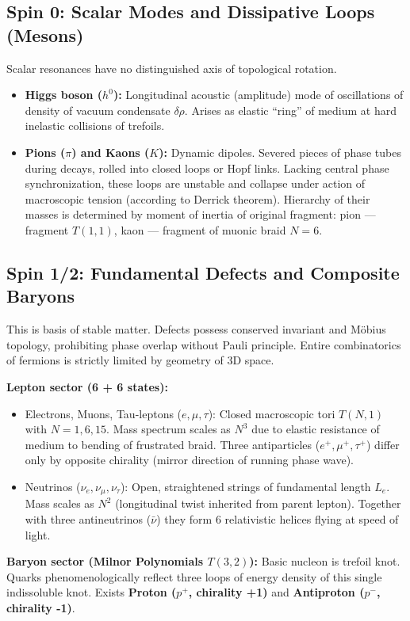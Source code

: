 \documentclass[12pt,a4paper]{article}
\begin{document}
\subsection{Spin 0: Scalar Modes and Dissipative Loops (Mesons)}
Scalar resonances have no distinguished axis of topological rotation.
\begin{itemize}
    \item \textbf{Higgs boson ($h^0$):} Longitudinal acoustic (amplitude) mode of oscillations of density of vacuum condensate $\delta\rho$. Arises as elastic ``ring'' of medium at hard inelastic collisions of trefoils.
    \item \textbf{Pions ($\pi$) and Kaons ($K$):} Dynamic dipoles. Severed pieces of phase tubes during decays, rolled into closed loops or Hopf links. Lacking central phase synchronization, these loops are unstable and collapse under action of macroscopic tension (according to Derrick theorem). Hierarchy of their masses is determined by moment of inertia of original fragment: pion --- fragment $T(1,1)$, kaon --- fragment of muonic braid $N=6$.
\end{itemize}

\subsection{Spin 1/2: Fundamental Defects and Composite Baryons}
This is basis of stable matter. Defects possess conserved invariant and Möbius topology, prohibiting phase overlap without Pauli principle. Entire combinatorics of fermions is strictly limited by geometry of 3D space.

\textbf{Lepton sector (6 + 6 states):}
\begin{itemize}
    \item Electrons, Muons, Tau-leptons ($e, \mu, \tau$): Closed macroscopic tori $T(N,1)$ with $N=1, 6, 15$. Mass spectrum scales as $N^3$ due to elastic resistance of medium to bending of frustrated braid. Three antiparticles ($e^+, \mu^+, \tau^+$) differ only by opposite chirality (mirror direction of running phase wave).
    \item Neutrinos ($\nu_e, \nu_\mu, \nu_\tau$): Open, straightened strings of fundamental length $L_e$. Mass scales as $N^2$ (longitudinal twist inherited from parent lepton). Together with three antineutrinos ($\bar{\nu}$) they form 6 relativistic helices flying at speed of light.
\end{itemize}

\textbf{Baryon sector (Milnor Polynomials $T(3,2)$):} Basic nucleon is trefoil knot. Quarks phenomenologically reflect three loops of energy density of this single indissoluble knot. Exists \textbf{Proton ($p^+$, chirality +1)} and \textbf{Antiproton ($p^-$, chirality -1)}.
\end{document}
